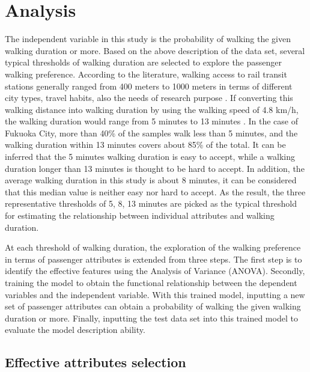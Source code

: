 %
\section{Analysis}
The independent variable in this study is the probability of walking the given walking duration or more. Based on the above description of the data set, several typical thresholds of walking duration are selected to explore the passenger walking preference. According to the literature, walking access to rail transit stations generally ranged from 400 meters to 1000 meters in terms of different city types, travel habits, also the needs of research purpose \cite{guerra2012half,murray1998public,o1996walking,keijer2000people,zhao2003forecasting,alshalalfah2007case}. If converting this walking distance into walking duration by using the walking speed of 4.8 km/h, the walking duration would range from 5 minutes to 13 minutes \cite{bohannon1997comfortable}. In the case of Fukuoka City, more than 40\% of the samples walk less than 5 minutes, and the walking duration within 13 minutes covers about 85\% of the total. It can be inferred that the 5 minutes walking duration is easy to accept, while a walking duration longer than 13 minutes is thought to be hard to accept. In addition, the average walking duration in this study is about 8 minutes, it can be considered that this median value is neither easy nor hard to accept. As the result, the three representative thresholds of 5, 8, 13 minutes are picked as the typical threshold for estimating the relationship between individual attributes and walking duration. 

At each threshold of walking duration, the exploration of the walking preference in terms of passenger attributes is extended from three steps. The first step is to identify the effective features using the Analysis of Variance (ANOVA). Secondly, training the model to obtain the functional relationship between the dependent variables and the independent variable. With this trained model, inputting a new set of passenger attributes can obtain a probability of walking the given walking duration or more. Finally, inputting the test data set into this trained model to evaluate the model description ability.

%
\subsection{Effective attributes selection}

